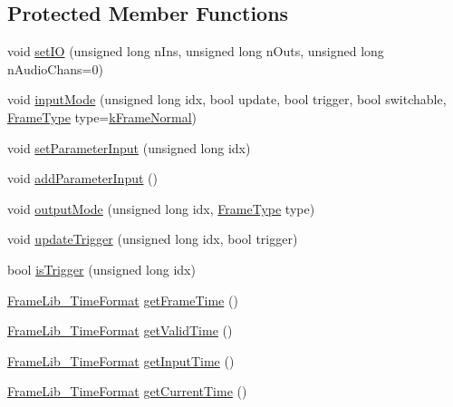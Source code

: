 \subsection*{Protected Member Functions}
\begin{DoxyCompactItemize}
\item 
void \hyperlink{class_frame_lib___d_s_p_a3d184baeb7b55fa099cb9c4a7393c70c}{set\+IO} (unsigned long n\+Ins, unsigned long n\+Outs, unsigned long n\+Audio\+Chans=0)
\item 
void \hyperlink{class_frame_lib___d_s_p_af9c0571cc8f82bb560be0f0cfcd73d78}{input\+Mode} (unsigned long idx, bool update, bool trigger, bool switchable, \hyperlink{_frame_lib___types_8h_ad495a9f61af7fff07d7e97979d1ab854}{Frame\+Type} type=\hyperlink{_frame_lib___types_8h_ad495a9f61af7fff07d7e97979d1ab854a4bc2388cbdd721f5039a32f95cd92b03}{k\+Frame\+Normal})
\item 
void \hyperlink{class_frame_lib___d_s_p_abcbe8babb74a7b85faf8846b4a0ff95f}{set\+Parameter\+Input} (unsigned long idx)
\item 
void \hyperlink{class_frame_lib___d_s_p_aa000b56c19ad1fbdc4f3fe56b0ca762d}{add\+Parameter\+Input} ()
\item 
void \hyperlink{class_frame_lib___d_s_p_a82ba080c4038eede7bae208555df1780}{output\+Mode} (unsigned long idx, \hyperlink{_frame_lib___types_8h_ad495a9f61af7fff07d7e97979d1ab854}{Frame\+Type} type)
\item 
void \hyperlink{class_frame_lib___d_s_p_a2e3084ad267a330ec021bd558edd3f57}{update\+Trigger} (unsigned long idx, bool trigger)
\item 
bool \hyperlink{class_frame_lib___d_s_p_acdcd85278b8cf1e80d50a7890d6975f9}{is\+Trigger} (unsigned long idx)
\item 
\hyperlink{_frame_lib___types_8h_a699a4071a9eaaa283906a5ebd0a79ac0}{Frame\+Lib\+\_\+\+Time\+Format} \hyperlink{class_frame_lib___d_s_p_a094f901b21cd50ddef100f2d58cdbbfb}{get\+Frame\+Time} ()
\item 
\hyperlink{_frame_lib___types_8h_a699a4071a9eaaa283906a5ebd0a79ac0}{Frame\+Lib\+\_\+\+Time\+Format} \hyperlink{class_frame_lib___d_s_p_ac0c0353bfbac1d75bc789f96382d6637}{get\+Valid\+Time} ()
\item 
\hyperlink{_frame_lib___types_8h_a699a4071a9eaaa283906a5ebd0a79ac0}{Frame\+Lib\+\_\+\+Time\+Format} \hyperlink{class_frame_lib___d_s_p_ae0ad1eb78dcdbb6b624c223079e9695e}{get\+Input\+Time} ()
\item 
\hyperlink{_frame_lib___types_8h_a699a4071a9eaaa283906a5ebd0a79ac0}{Frame\+Lib\+\_\+\+Time\+Format} \hyperlink{class_frame_lib___d_s_p_a40651d3b4ea9017d4c399b962d900645}{get\+Current\+Time} ()

\end{DoxyCompactItemize}
